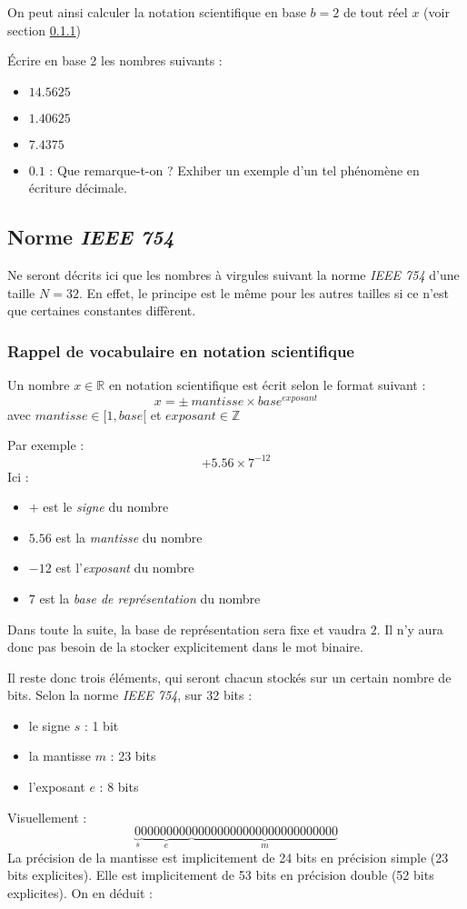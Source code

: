\documentclass[../../main.tex]{subfiles}
\begin{document}
On peut ainsi calculer la notation scientifique en base $b = 2$ de tout réel $x$ (voir section \ref{ssub:rappel_de_vocabulaire_en_notation_scientifique})

 Écrire en base 2 les nombres suivants :
\begin{itemize}
     \item $14.5625$
     \item $1.40625$
     \item $7.4375$
     \item $0.1$ : Que remarque-t-on ? Exhiber un exemple d'un tel phénomène en écriture décimale.
\end{itemize} 
\subsection{Norme \textit{IEEE 754}}
Ne seront décrits ici que les nombres à virgules suivant la norme \textit{IEEE 754} d'une taille $N = 32$. En effet, le principe est le même pour les autres tailles si ce n'est que certaines constantes diffèrent.

\subsubsection{Rappel de vocabulaire en notation scientifique} \label{ssub:rappel_de_vocabulaire_en_notation_scientifique}
Un nombre $x\in{\mathbb{R}}$ en notation scientifique est écrit selon le format suivant :
$$x = \pm\ mantisse \times{base^{exposant}}$$
avec $mantisse\in{[1, base[}$ et $exposant\in{\mathbb{Z}}$

Par exemple :
$$+ 5.56\times{7^{-12}}$$
Ici :
\begin{itemize}
     \item $+$ est le \textit{signe} du nombre
     \item $5.56$ est la \textit{mantisse} du nombre
     \item $-12$ est l'\textit{exposant} du nombre
     \item $7$ est la \textit{base de représentation} du nombre
\end{itemize}
Dans toute la suite, la base de représentation sera fixe et vaudra $2$. Il n'y aura donc pas besoin de la stocker explicitement dans le mot binaire.

Il reste donc trois éléments, qui seront chacun stockés sur un certain nombre de bits. \newline
Selon la norme \textit{IEEE 754}, sur 32 bits :
\begin{itemize}
     \item le signe $s$ : 1 bit
     \item la mantisse $m$ : 23 bits
     \item l'exposant $e$ : 8 bits
\end{itemize}
Visuellement :
$$\underbrace{0}_{s}\underbrace{00000000}_{e}\underbrace{00000000000000000000000}_{m}$$
La précision de la mantisse est implicitement de 24 bits en précision simple (23 bits explicites). Elle est implicitement de 53 bits en précision double (52 bits explicites). On en déduit :
\end{document}
